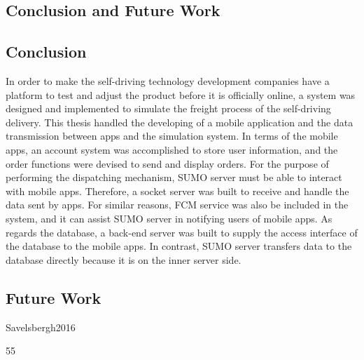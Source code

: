 \documentclass[12pt]{ksthesis}
\begin{document}
\begin{thesis}
{%







\chapter{Conclusion and Future Work} \label{Chap:Conclusion}

\section{Conclusion}
In order to make the self-driving technology development companies have a platform to test and adjust the product before it is officially online, a system was designed and implemented to simulate the freight process of the self-driving delivery. This thesis handled the developing of a mobile application and the data transmission between apps and the simulation system. In terms of the mobile apps, an account system was accomplished to store user information, and the order functions were devised to send and display orders. For the purpose of performing the dispatching mechanism, SUMO server must be able to interact with mobile apps. Therefore, a socket server was built to receive and handle the data sent by apps. For similar reasons, FCM service was also be included in the system, and it can assist SUMO server in notifying users of mobile apps. As regards the database, a back-end server was built to supply the access interface of the database to the mobile apps. In contrast, SUMO server transfers data to the database directly because it is on the inner server side.


\section{Future Work}



\cite{Savelsbergh2016} Savelsbergh2016

\cite{Crainic2015}55

\cite{Habault2019}




} \end{thesis}

\singlespace {\large



}





\doublespace

\begin{vita}
\Thesisspace \large{


}\end{vita}
\end{document}

